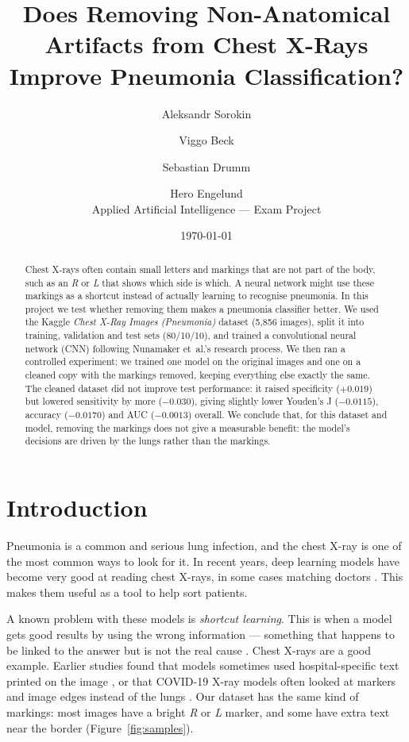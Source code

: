 \documentclass[10pt,twocolumn]{article}
\title{\vspace{-1.2em}Does Removing Non-Anatomical Artifacts from Chest X-Rays
Improve Pneumonia Classification?}
\author{Aleksandr Sorokin \and Viggo Beck \and Sebastian Drumm \and Hero Engelund\\[2pt]
\small Applied Artificial Intelligence --- Exam Project}
\date{\small \today}
\begin{document}
\maketitle

\begin{abstract}
\noindent
Chest X-rays often contain small letters and markings that are not part of the
body, such as an \emph{R} or \emph{L} that shows which side is which. A neural
network might use these markings as a shortcut instead of actually learning to
recognise pneumonia. In this project we test whether removing them makes a
pneumonia classifier better. We used the Kaggle \emph{Chest X-Ray Images
(Pneumonia)} dataset (5{,}856 images), split it into training, validation and
test sets (80/10/10), and trained a convolutional neural network (CNN) following
Nunamaker et~al.'s research process. We then ran a controlled experiment: we
trained one model on the original images and one on a cleaned copy with the
markings removed, keeping everything else exactly the same. The cleaned dataset
did not improve test performance: it raised specificity ($+0.019$) but lowered
sensitivity by more ($-0.030$), giving slightly lower Youden's J ($-0.0115$),
accuracy ($-0.0170$) and AUC ($-0.0013$) overall. We conclude that, for this
dataset and model, removing the markings does not give a measurable benefit: the
model's decisions are driven by the lungs rather than the markings.
\end{abstract}

\section{Introduction}
\label{sec:intro}
Pneumonia is a common and serious lung infection, and the chest X-ray is one of
the most common ways to look for it. In recent years, deep learning models have
become very good at reading chest X-rays, in some cases matching doctors
\cite{rajpurkar2017chexnet}. This makes them useful as a tool to help sort
patients.

A known problem with these models is \emph{shortcut learning}. This is when a
model gets good results by using the wrong information --- something that happens
to be linked to the answer but is not the real cause \cite{geirhos2020shortcut}.
Chest X-rays are a good example. Earlier studies found that models sometimes used
hospital-specific text printed on the image \cite{zech2018confound}, or that
COVID-19 X-ray models often looked at markers and image edges instead of the
lungs \cite{degrave2021shortcut}. Our dataset has the same kind of markings: most
images have a bright \emph{R} or \emph{L} marker, and some have extra text near
the border (Figure~\ref{fig:samples}).
\end{document}
